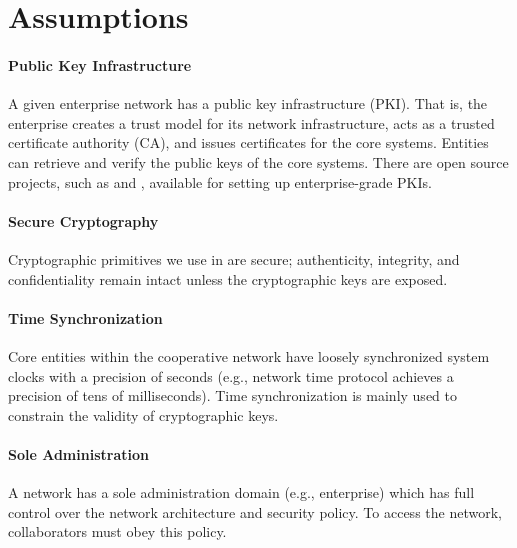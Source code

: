 

\section{Assumptions}
\label{sec:assumptions}

\paragraph{Public Key Infrastructure}
A given enterprise network has a public key infrastructure (PKI). That is, the enterprise
creates a trust model for its network infrastructure, acts as a trusted certificate authority
(CA), and issues certificates for the core systems. Entities can retrieve and verify the
public keys of the core systems. There are open source projects, such as  and , available for setting up enterprise-grade PKIs.

\paragraph{Secure Cryptography}
Cryptographic primitives we use in \name are secure; authenticity, integrity, and
confidentiality remain intact unless the cryptographic keys are exposed.

\paragraph{Time Synchronization}
Core entities within the cooperative network have loosely synchronized system clocks with a
precision of seconds (e.g., network time protocol achieves a precision of tens of milliseconds).
Time synchronization is mainly used to constrain the validity of cryptographic keys.

\paragraph{Sole Administration}
A network has a sole administration domain (e.g., enterprise) which has full control over
the network architecture and security policy. To access the network, collaborators
must obey this policy.
